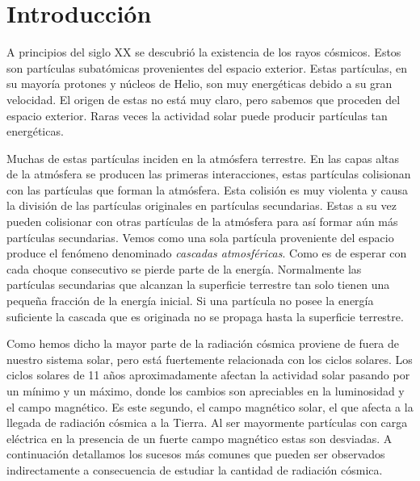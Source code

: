 \chapter{Introducción}
\label{cap1}

A principios del siglo XX se descubrió la existencia de los rayos cósmicos. Estos son partículas subatómicas provenientes del espacio exterior. Estas
partículas, en su mayoría protones y núcleos de Helio, son muy energéticas debido a su gran velocidad. El origen de estas no está muy claro, pero
sabemos que proceden del espacio exterior. Raras veces la actividad solar puede producir partículas tan energéticas. 
\par
Muchas de estas partículas inciden en la atmósfera terrestre. En las capas altas de la atmósfera se producen las primeras interacciones, estas
partículas colisionan con las partículas que forman la atmósfera. Esta colisión es muy violenta y causa la división de las partículas originales en
partículas secundarias. Estas a su vez pueden colisionar con otras partículas de la atmósfera para así formar aún más partículas secundarias. Vemos
como una sola partícula proveniente del espacio produce el fenómeno denominado \emph{cascadas atmosféricas}. Como es de esperar con cada choque
consecutivo se pierde parte de la energía. Normalmente las partículas secundarias que alcanzan la superficie terrestre tan solo tienen una pequeña
fracción de la energía inicial. Si una partícula no posee la energía suficiente la cascada que es originada no se propaga hasta la superficie
terrestre.
\par
Como hemos dicho la mayor parte de la radiación cósmica proviene de fuera de nuestro sistema solar, pero está fuertemente relacionada con los ciclos
solares. Los ciclos solares de 11 años aproximadamente afectan la actividad solar pasando por un mínimo y un máximo, donde los cambios son apreciables
en la luminosidad y el campo magnético. Es este segundo, el campo magnético solar, el que afecta a la llegada de radiación cósmica a la Tierra. Al ser
mayormente partículas con carga eléctrica en la presencia de un fuerte campo magnético estas son desviadas. A continuación detallamos los sucesos más
comunes que pueden ser observados indirectamente a consecuencia de estudiar la cantidad de radiación cósmica.
